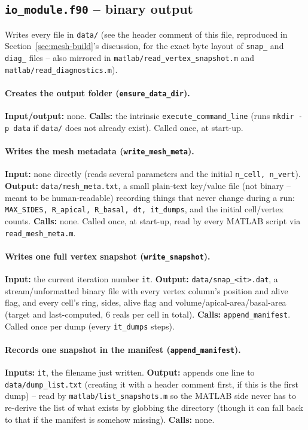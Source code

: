 \documentclass[11pt,a4paper]{report}
\begin{document}
\subsection{\texttt{io\_module.f90} -- binary output}
\label{sec:io-module-code}
Writes every file in \texttt{data/} (see the header comment of this
file, reproduced in Section~\ref{sec:mesh-build}'s discussion, for the
exact byte layout of \texttt{snap\_} and \texttt{diag\_} files -- also
mirrored in \texttt{matlab/read\_vertex\_snapshot.m} and
\texttt{matlab/read\_diagnostics.m}).
\paragraph{Creates the output folder (\texttt{ensure\_data\_dir}).}
\textbf{Input/output:} none. \textbf{Calls:} the intrinsic
\texttt{execute\_command\_line} (runs \texttt{mkdir -p data} if
\texttt{data/} does not already exist). Called once, at start-up.
\paragraph{Writes the mesh metadata (\texttt{write\_mesh\_meta}).}
\textbf{Input:} none directly (reads several parameters and the
initial \texttt{n\_cell, n\_vert}). \textbf{Output:}
\texttt{data/mesh\_meta.txt}, a small plain-text key/value file (not
binary -- meant to be human-readable) recording things that never
change during a run: \texttt{MAX\_SIDES, R\_apical, R\_basal, dt,
it\_dumps}, and the initial cell/vertex counts. \textbf{Calls:} none.
Called once, at start-up, read by every MATLAB script via
\texttt{read\_mesh\_meta.m}.
\paragraph{Writes one full vertex snapshot (\texttt{write\_snapshot}).}
\textbf{Input:} the current iteration number \texttt{it}.
\textbf{Output:} \texttt{data/snap\_<it>.dat}, a stream/unformatted
binary file with every vertex column's position and alive flag, and
every cell's ring, sides, alive flag and volume/apical-area/basal-area
(target and last-computed, 6 reals per cell in total). \textbf{Calls:}
\texttt{append\_manifest}. Called once per dump (every
\texttt{it\_dumps} steps).
\paragraph{Records one snapshot in the manifest
(\texttt{append\_manifest}).} \textbf{Inputs:} \texttt{it}, the
filename just written. \textbf{Output:} appends one line to
\texttt{data/dump\_list.txt} (creating it with a header comment first,
if this is the first dump) -- read by \texttt{matlab/list\_snapshots.m}
so the MATLAB side never has to re-derive the list of what exists by
globbing the directory (though it can fall back to that if the
manifest is somehow missing). \textbf{Calls:} none.
\end{document}
